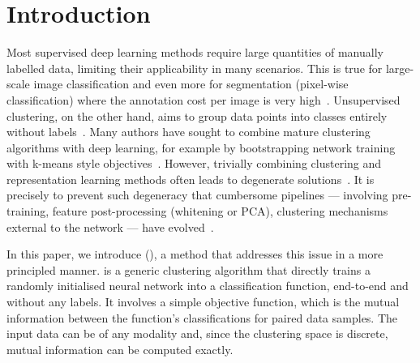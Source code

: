 \section{Introduction}\label{s:intro}

Most supervised deep learning methods require large quantities of manually labelled data, limiting their applicability in many scenarios.
This is true for large-scale image classification and even more for segmentation (pixel-wise classification) where the annotation cost per image is very high~\cite{lin2014microsoft,girshick2014rich}.
Unsupervised clustering, on the other hand, aims to group data points into classes entirely without labels~\cite{hartigan1972direct}.
Many authors have sought to combine mature clustering algorithms with deep learning, for example by bootstrapping network training with k-means style objectives~\cite{xie2016unsupervised, haeusser2018associative, caron2018deep}.
However, trivially combining clustering and representation learning methods often leads to degenerate solutions~\cite{caron2018deep, xie2016unsupervised}.
It is precisely to prevent such degeneracy that cumbersome pipelines --- involving pre-training, feature post-processing (whitening or PCA), clustering mechanisms external to the network --- have evolved~\cite{caron2018deep,doersch2015unsupervised,dosovitskiy2015discriminative,xie2016unsupervised}.

%



In this paper, we introduce \methodname (\methodnameshort), a method that addresses this issue in a more principled manner.
\methodnameshort is a generic clustering algorithm that directly trains a randomly initialised neural network into a classification function, end-to-end and without any labels.
It involves a simple objective function, which is the mutual information between the function's classifications for paired data samples. The input data can be of any modality and, since the clustering space is discrete, mutual information can be computed exactly.

